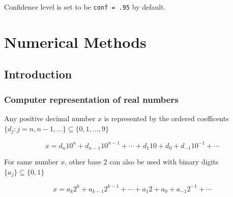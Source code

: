 \documentclass[]{book}
\newenvironment{Shaded}{\begin{snugshade}}{\end{snugshade}}
\newcommand{\CommentTok}[1]{\textcolor[rgb]{0.56,0.35,0.01}{\textit{#1}}}
\newcommand{\DataTypeTok}[1]{\textcolor[rgb]{0.13,0.29,0.53}{#1}}
\newcommand{\KeywordTok}[1]{\textcolor[rgb]{0.13,0.29,0.53}{\textbf{#1}}}
\newcommand{\NormalTok}[1]{#1}
\newcommand{\StringTok}[1]{\textcolor[rgb]{0.31,0.60,0.02}{#1}}
\theoremstyle{definition}
\theoremstyle{definition}
\theoremstyle{definition}
\theoremstyle{remark}
\begin{document}
Confidence level is set to be \texttt{conf\ =\ .95} by default.

\begin{Shaded}
\end{Shaded}

\hypertarget{numerical-methods}{%
\chapter{Numerical Methods}\label{numerical-methods}}

\hypertarget{introduction-1}{%
\section{Introduction}\label{introduction-1}}

\hypertarget{computer-representation-of-real-numbers}{%
\subsection{Computer representation of real numbers}\label{computer-representation-of-real-numbers}}

Any positive decimal number \(x\) is represented by the ordered coefficents \(\{ d_j : j = n, n - 1, \ldots \} \subseteq \{ 0, 1, \ldots, 9 \}\)

\begin{equation}
  x = d_n 10^n + d_{n - 1} 10 ^{n - 1} + \cdots + d_1 10 + d_0 + d_{-1} 10^{-1} + \cdots
  \label{eq:decimal}
\end{equation}

For same number \(x\), other base \(2\) can also be used with binary digits \(\{ a_j \} \subseteq \{ 0, 1 \}\)

\begin{equation}
  x = a_k 2^k + a_{k - 1} 2 ^{k - 1} + \cdots + a_1 2 + a_0 + a_{-1} 2^{-1} + \cdots
  \label{eq:base2}
\end{equation}
\end{document}
